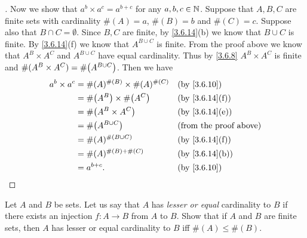 \begin{proof}[]
	Now we show that \(a^b \times a^c = a^{b + c}\) for any \(a, b, c \in \mathbb{N}\).
	Suppose that \(A, B, C\) are finite sets with cardinality \(\#(A) = a\), \(\#(B) = b\) and \(\#(C) = c\).
	Suppose also that \(B \cap C = \emptyset\).
	Since \(B, C\) are finite, by \cref{3.6.14}(b) we know that \(B \cup C\) is finite.
	By \cref{3.6.14}(f) we know that \(A^{B \cup C}\) is finite.
	From the proof above we know that \(A^B \times A^C\) and \(A^{B \cup C}\) have equal cardinality.
	Thus by \cref{3.6.8} \(A^B \times A^C\) is finite and \(\#(A^B \times A^C) = \#\pa{A^{B \cup C}}\).
	Then we have
	\begin{align*}
		a^b \times a^c & = \#(A)^{\#(B)} \times \#(A)^{\#(C)} &  & \by{3.6.10}                   \\
		               & = \#\pa{A^B} \times \#\pa{A^C}       &  & \by{3.6.14}[f]                \\
		               & = \#\pa{A^B \times A^C}              &  & \by{3.6.14}[e]                \\
		               & = \#\pa{A^{B \cup C}}                &  & \text{(from the proof above)} \\
		               & = \#(A)^{\#(B \cup C)}               &  & \by{3.6.14}[f]                \\
		               & = \#(A)^{\#(B) + \#(C)}              &  & \by{3.6.14}[b]                \\
		               & = a^{b + c}.                         &  & \by{3.6.10}
	\end{align*}
\end{proof}

\begin{ex}\label{ex:3.6.7}
	Let \(A\) and \(B\) be sets.
	Let us say that \(A\) has \emph{lesser or equal} cardinality to \(B\) if there exists an injection \(f : A \to B\) from \(A\) to \(B\).
	Show that if \(A\) and \(B\) are finite sets, then \(A\) has lesser or equal cardinality to \(B\) iff \(\#(A) \leq \#(B)\).
\end{ex}

